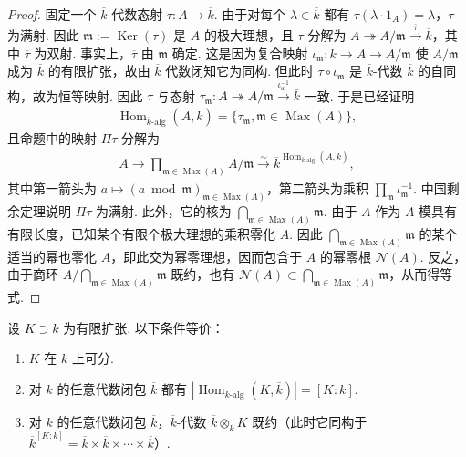 \begin{proof}
固定一个 $\overline k$-代数态射 $\tau:A\longrightarrow\overline k$. 由于对每个 $\lambda\in\overline k$ 都有 $\tau(\lambda\cdot1_A)=\lambda$，$\tau$ 为满射. 因此 $\mathfrak m:=\operatorname{Ker}(\tau)$ 是 $A$ 的极大理想，且 $\tau$ 分解为 $A\twoheadrightarrow A/\mathfrak m\xrightarrow{\overline\tau}\overline k$，其中 $\overline\tau$ 为双射. 事实上，$\overline\tau$ 由 $\mathfrak m$ 确定. 这是因为复合映射 $\iota_{\mathfrak m}:\overline k\longrightarrow A\longrightarrow A/\mathfrak m$ 使 $A/\mathfrak m$ 成为 $\overline k$ 的有限扩张，故由 $\overline k$ 代数闭知它为同构. 但此时 $\overline\tau\circ\iota_{\mathfrak m}$ 是 $\overline k$-代数 $\overline k$ 的自同构，故为恒等映射. 因此 $\tau$ 与态射 $\tau_{\mathfrak m}:A\twoheadrightarrow A/\mathfrak m\xrightarrow{\iota_{\mathfrak m}^{-1}}\overline k$ 一致. 于是已经证明
\begin{align*}
\operatorname{Hom}_{\overline k\text{-alg}}(A,\overline k)=\{\tau_{\mathfrak m},\mathfrak m\in\operatorname{Max}(A)\},
\end{align*}
且命题中的映射 $\Pi\tau$ 分解为
\begin{align*}
A\longrightarrow\prod_{\mathfrak m\in\operatorname{Max}(A)}A/\mathfrak m\xrightarrow{\sim}\overline k^{\operatorname{Hom}_{\overline k\text{-alg}}(A,\overline k)},
\end{align*}
其中第一箭头为 $a\mapsto(a\bmod\mathfrak m)_{\mathfrak m\in\operatorname{Max}(A)}$，第二箭头为乘积 $\prod_{\mathfrak m}\iota_{\mathfrak m}^{-1}$. 中国剩余定理说明 $\Pi\tau$ 为满射. 此外，它的核为 $\bigcap_{\mathfrak m\in\operatorname{Max}(A)}\mathfrak m$. 由于 $A$ 作为 $A$-模具有有限长度，已知某个有限个极大理想的乘积零化 $A$. 因此 $\bigcap_{\mathfrak m\in\operatorname{Max}(A)}\mathfrak m$ 的某个适当的幂也零化 $A$，即此交为幂零理想，因而包含于 $A$ 的幂零根 $\mathcal N(A)$. 反之，由于商环 $A/\bigcap_{\mathfrak m\in\operatorname{Max}(A)}\mathfrak m$ 既约，也有 $\mathcal N(A)\subset\bigcap_{\mathfrak m\in\operatorname{Max}(A)}\mathfrak m$，从而得等式.
\end{proof}
\begin{theorem*}
设 $K\supset k$ 为有限扩张. 以下条件等价：
\begin{enumerate}[label=\roman*)]
\item $K$ 在 $k$ 上可分.
\item 对 $k$ 的任意代数闭包 $\overline k$ 都有 $|\operatorname{Hom}_{k\text{-alg}}(K,\overline k)|=[K:k]$.
\item 对 $k$ 的任意代数闭包 $\overline k$，$\overline k$-代数 $\overline k\otimes_k K$ 既约（此时它同构于 $\overline k^{[K:k]}=\overline k\times\overline k\times\cdots\times\overline k$）.
\end{enumerate}
\end{theorem*}
